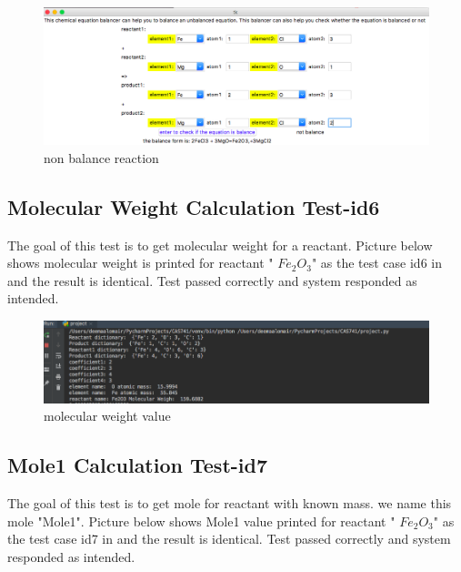 \documentclass[12pt, titlepage]{article}
\begin{document}
\begin{figure}[H]
 \begin{center}
 \includegraphics [width=\textwidth]{nonbalance}
 \caption{\label{ Figure 7:} non balance reaction}
 \end{center}
 \end{figure}

\subsection{Molecular Weight Calculation Test-id6}

The goal of this test is to get molecular weight for a reactant. Picture below shows molecular weight is printed for reactant " $Fe_2$$O_3$" as the test case id6 in \cite{SystemVnVPlan} and the result is identical. Test passed correctly and system responded as intended.

\begin{figure}[H]
 \begin{center}
 \includegraphics [width=\textwidth]{molecularweight}
 \caption{\label{ Figure 8:} molecular weight value}
 \end{center}
 \end{figure}

\subsection{Mole1 Calculation Test-id7}

The goal of this test is to get mole for reactant with known mass. we name this mole "Mole1". Picture below shows Mole1 value printed for reactant " $Fe_2$$O_3$" as the test case id7 in \cite{SystemVnVPlan} and the result is identical. Test passed correctly and system responded as intended.
\end{document}

